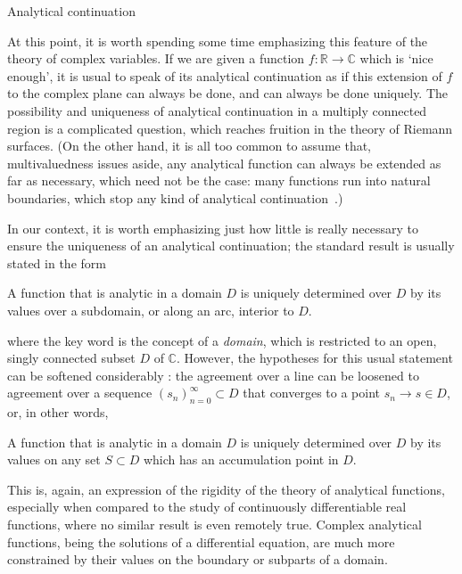 \vspace{5mm}


\begin{mathaside}{Analytical continuation}
\label{aside.analytical-continuation}

At this point, it is worth spending some time emphasizing this feature of the theory of complex variables. If we are given a function $f:\mathbb{R}\to \mathbb{C}$ which is `nice enough', it is usual to speak of its analytical continuation as if this extension of $f$ to the complex plane can always be done, and can always be done uniquely. The possibility and uniqueness of analytical continuation in a multiply connected region is a complicated question, which reaches fruition in the theory of Riemann surfaces. (On the other hand, it is all too common to assume that, multivaluedness issues aside, any analytical function can always be extended as far as necessary, which need not be the case: many functions run into natural boundaries, which stop any kind of analytical continuation~\cite[p.~191]{noguchi_complex_analysis}.)

\vspace{\maskip}
In our context, it is worth emphasizing just how little is really necessary to ensure the uniqueness of an analytical continuation; the standard result \cite[given e.g. in Ref.][pp.~283ff]{churchill_complex_variables} is usually stated in the form

\begin{theorem}
A function that is analytic in a domain $D$ is uniquely determined over $D$ by its values over a subdomain, or along an arc, interior to $D$.
\end{theorem}


where the key word is the concept of a \textit{domain}, which is restricted to an open, singly connected subset $D$ of $\mathbb{C}$. However, the hypotheses for this usual statement can be softened considerably \cite[p.~95]{noguchi_complex_analysis}: the agreement over a line can be loosened to agreement over a sequence $(s_n)_{n=0}^\infty \subset D$ that converges to a point $s_n\to s\in D$, or, in other words,

\begin{theorem}
A function that is analytic in a domain $D$ is uniquely determined over $D$ by its values on any set $S\subset D$ which has an accumulation point in $D$.
\end{theorem}


This is, again, an expression of the rigidity of the theory of analytical functions, especially when compared to the study of continuously differentiable real functions, where no similar result is even remotely true. Complex analytical functions, being the solutions of a differential equation, are much more constrained by their values on the boundary or subparts of a domain.

\end{mathaside}




